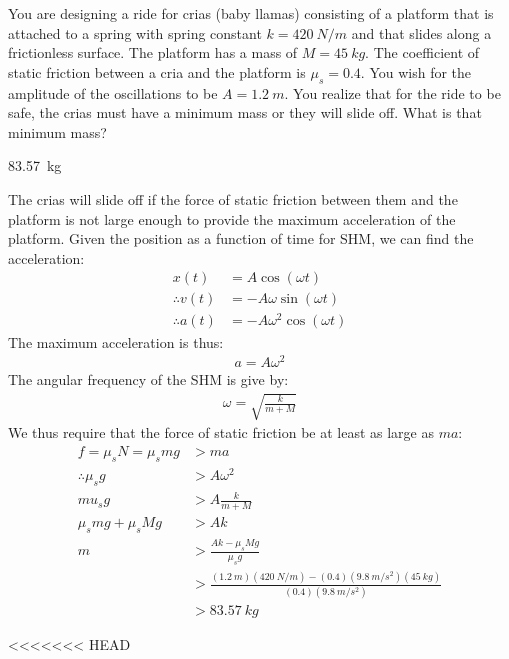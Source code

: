 \question You are designing a ride for crias (baby llamas) consisting of a platform that is attached to a spring with spring constant $k=\SI{420}{N/m}$ and that slides along a frictionless surface. The platform has a mass of $M=\SI{45}{kg}$. The coefficient of static friction between a cria and the platform is $\mu_s=0.4$. You wish for the amplitude of the oscillations to be $A=\SI{1.2}{m}$. You realize that for the ride to be safe, the crias must have a minimum mass or they will slide off. What is that minimum mass?
\begin{finalanswer}
\SI{83.57}{kg}
\end{finalanswer}
\begin{solution}
The crias will slide off if the force of static friction between them and the platform is not large enough to provide the maximum acceleration of the platform. Given the position as a function of time for SHM, we can find the acceleration:
\begin{align*}
x(t)&=A\cos(\omega t)\\
\therefore v(t) &=-A\omega\sin(\omega t) \\
\therefore a(t) &=-A\omega^2\cos(\omega t)
\end{align*}
The maximum acceleration is thus:
\begin{align*}
a = A\omega^2
\end{align*}
The angular frequency of the SHM is give by:
\begin{align*}
\omega = \sqrt{\frac{k}{m+M}}
\end{align*}
We thus require that the force of static friction be at least as large as $ma$:
\begin{align*}
f=\mu_sN=\mu_smg &> ma\\
\therefore \mu_s g &> A\omega^2\\
 mu_s g &> A \frac{k}{m+M}\\
 \mu_smg+\mu_sMg &> Ak\\
 m &> \frac{Ak-\mu_sMg}{\mu_sg}\\
 &> \frac{(\SI{1.2}{m})(\SI{420}{N/m})-(0.4)(\SI{9.8}{m/s^2})(\SI{45}{kg})}{(0.4)(\SI{9.8}{m/s^2})}\\
 &>\SI{83.57}{kg}
\end{align*}
\end{solution}

<<<<<<< HEAD

